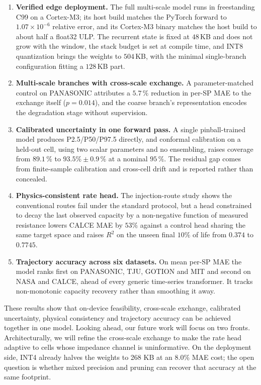 \documentclass[final,5p,times,twocolumn]{elsarticle}
\begin{document}
\begin{enumerate}
\item \textbf{Verified edge deployment.} The full multi-scale model runs in
freestanding C99 on a Cortex-M3; its host build matches the PyTorch forward to
$1.07\times10^{-6}$ relative error, and its Cortex-M3 binary matches the host
build to about half a float32 ULP. The recurrent state is fixed at $48$\,KB and
does not grow with the window, the stack budget is set at compile time, and
INT8 quantization brings the weights to $504$\,KB, with the minimal
single-branch configuration fitting a $128$\,KB part.

\item \textbf{Multi-scale branches with cross-scale exchange.} A
parameter-matched control on PANASONIC attributes a $5.7\,\%$ reduction in
per-SP MAE to the exchange itself ($p=0.014$), and the coarse branch's
representation encodes the degradation stage without supervision.

\item \textbf{Calibrated uncertainty in one forward pass.} A single
pinball-trained model produces P2.5/P50/P97.5 directly, and conformal
calibration on a held-out cell, using two scalar parameters and no ensembling,
raises coverage from $89.1\,\%$ to $93.5\%\pm0.9\,\%$ at a nominal $95\,\%$.
The residual gap comes from finite-sample calibration and cross-cell drift and
is reported rather than concealed.

\item \textbf{Physics-consistent rate head.} The injection-route study shows
the conventional routes fail under the standard protocol, but a head
constrained to decay the last observed capacity by a non-negative function of
measured resistance lowers CALCE MAE by $53\%$ against a control head sharing
the same target space and raises $R^2$ on the unseen final $10\%$ of life from
$0.374$ to $0.7745$.

\item \textbf{Trajectory accuracy across six datasets.} On mean per-SP MAE the
model ranks first on PANASONIC, TJU, GOTION and MIT and second on NASA and
CALCE, ahead of every generic time-series transformer. It tracks non-monotonic capacity recovery rather than
smoothing it away.
\end{enumerate}

These results show that on-device feasibility, cross-scale exchange, calibrated
uncertainty, physical consistency and trajectory accuracy can be achieved
together in one model.
Looking ahead, our future work will focus on two fronts. Architecturally, we will
refine the cross-scale exchange to make the rate head adaptive to cells whose impedance
channel is uninformative. On the deployment side, INT4 already halves the weights
to 268 KB at an 8.0\% MAE cost; the open question is whether mixed precision and
pruning can recover that accuracy at the same footprint.
\end{document}
